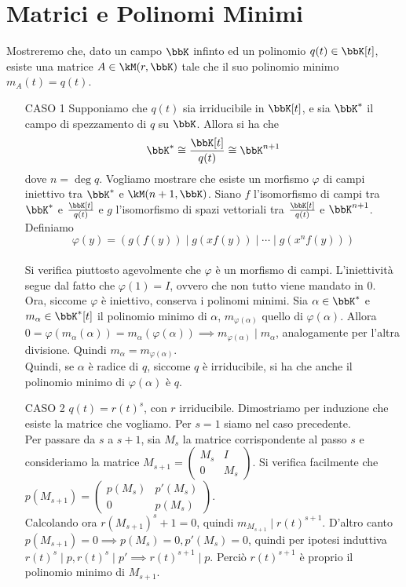 \documentclass[a4paper,NoNotes,GeneralMath]{stdmdoc}
\begin{document}
	\section*{Matrici e Polinomi Minimi}
	 Mostreremo che, dato un campo $\bbK$ infinto ed un polinomio $q(t) \in \bbK[t]$, esiste una matrice $A \in \kM(r, \bbK)$ tale che il suo polinomio minimo $m_A (t) = q(t)$. \\
	\begin{itemize}
	\item[CASO 1] Supponiamo che $q(t)$ sia irriducibile in $\bbK[t]$, e sia $\bbK^{*}$ il campo di spezzamento di $q$ su $\bbK$. Allora si ha che $$\bbK^{*} \cong \frac{\bbK[t]}{q(t)} \cong \bbK^{n+1} $$ dove $n = \deg q$. Vogliamo mostrare che esiste un morfismo $\varphi$ di campi iniettivo tra $\bbK^{*}$ e $\kM(n+1, \bbK)$. Siano $f$ l'isomorfismo di campi tra $\bbK^{*}$ e $\frac{\bbK[t]}{q(t)}$ e $g$ l'isomorfismo di spazi vettoriali tra $\frac{\bbK[t]}{q(t)}$ e $\bbK^{n+1}$. Definiamo $$\varphi(y) = \left( g(f(y)) \middle| g(xf(y)) \middle| \cdots \middle| g(x^n f(y)) \right)$$ \\ Si verifica piuttosto agevolmente che $\varphi$ è un morfismo di campi. L'iniettività segue dal fatto che $\varphi(1) = I$, ovvero che non tutto viene mandato in $0$. \\ Ora, siccome $\varphi$ è iniettivo, conserva i polinomi minimi. Sia $\alpha \in \bbK^{*}$ e $m_\alpha \in \bbK^{*}[t]$ il polinomio minimo di $\alpha$, $m_{\varphi(\alpha)}$ quello di $\varphi(\alpha)$. Allora $0 = \varphi(m_\alpha(\alpha)) = m_\alpha(\varphi(\alpha)) \implies m_{\varphi(\alpha)} \mid m_\alpha$, analogamente per l'altra divisione. Quindi $m_\alpha = m_{\varphi(\alpha)}$. \\ Quindi, se $\alpha$ è radice di $q$, siccome $q$ è irriducibile, si ha che anche il polinomio minimo di $\varphi(\alpha)$ è $q$.
	\item[CASO 2] $q(t) = r(t)^s$, con $r$ irriducibile. Dimostriamo per induzione che esiste la matrice che vogliamo. Per $s=1$ siamo nel caso precedente. \\ Per passare da $s$ a $s+1$, sia $M_s$ la matrice corrispondente al passo $s$ e consideriamo la matrice $M_{s+1} = \left( \begin{array}{c|c} M_s & I \\ \hline 0 & M_s \end{array} \right)$. Si verifica facilmente che $p(M_{s+1}) = \left( \begin{array}{c|c} p(M_s) & p'(M_s) \\ \hline 0 & p(M_s) \end{array} \right)$. \\ Calcolando ora $r(M_{s+1})^s+1 = 0$, quindi $m_{M_{s+1}} \mid r(t)^{s+1}$. D'altro canto $p(M_{s+1}) = 0 \implies p(M_{s}) = 0, p'(M_s) = 0$, quindi per ipotesi induttiva $r(t)^s \mid p, r(t)^s \mid p' \implies r(t)^{s+1} \mid p$. Perciò $r(t)^{s+1}$ è proprio il polinomio minimo di $M_{s+1}$.

\end{itemize}
\end{document}
